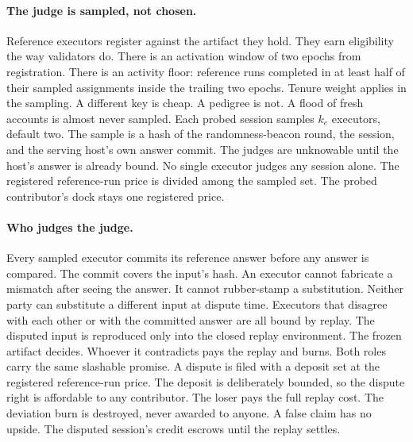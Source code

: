 \documentclass[11pt]{article}
\begin{document}
\paragraph{The judge is sampled, not chosen.} Reference
executors register against the artifact they hold. They earn
eligibility the way validators do. There is an activation window
of two epochs from registration. There is an activity floor:
reference runs completed in at least half of their sampled
assignments inside the trailing two epochs. Tenure weight applies
in the sampling. A different key is cheap. A pedigree is not. A
flood of fresh accounts is almost never sampled. Each probed
session samples $k_e$ executors, default two. The sample is a
hash of the randomness-beacon round, the session, and the serving
host's own
answer commit. The judges are unknowable until the host's answer
is already bound. No single executor judges any session alone.
The registered reference-run price is divided among the sampled
set. The probed contributor's dock stays one registered price.

\paragraph{Who judges the judge.} Every sampled executor
commits its reference answer before any answer is compared. The
commit covers the input's hash. An executor cannot fabricate a
mismatch after seeing the answer. It cannot rubber-stamp a
substitution. Neither party can substitute a different input at
dispute time. Executors that disagree with each other or with the
committed answer are all bound by replay. The disputed input is
reproduced only into the closed replay environment. The frozen
artifact decides. Whoever it contradicts pays the replay and
burns. Both roles carry the same slashable promise. A dispute is
filed with a deposit set at the registered reference-run price.
The deposit is deliberately bounded, so the dispute right is
affordable to any contributor. The loser pays the full replay
cost. The deviation burn is destroyed, never awarded to anyone.
A false claim has no upside. The disputed session's credit
escrows until the replay settles.
\end{document}
